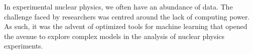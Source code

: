  In experimental nuclear physics, we often have an abundance of data. The challenge faced by researchers was centred around the lack of computing power. As such, it was the advent of optimized tools for machine learning that opened the avenue to explore complex models in the analysis of nuclear physics experiments. 